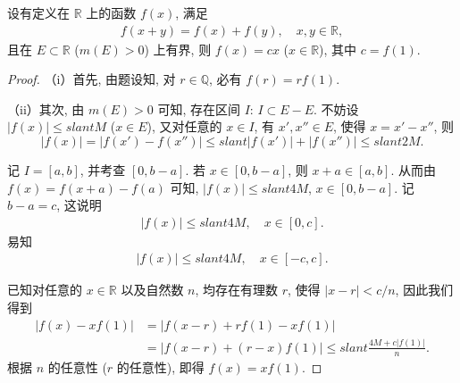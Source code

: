 \documentclass[../../main.tex]{subfiles}
\begin{document}
\begin{proposition}
设有定义在 $\mathbb{R}$ 上的函数 $f(x)$, 满足
\begin{align*}
f(x + y) = f(x) + f(y),\quad x,y\in\mathbb{R},
\end{align*}
且在 $E\subset\mathbb{R}$ ($m(E)>0$) 上有界, 则 $f(x)=cx$ ($x\in\mathbb{R}$), 其中 $c = f(1)$.

\end{proposition}
\begin{proof}
（i）首先, 由题设知, 对 $r\in\mathbb{Q}$, 必有 $f(r)=rf(1)$.

（ii）其次, 由 $m(E)>0$ 可知, 存在区间 $I$: $I\subset E - E$. 不妨设 $|f(x)|\leqslant slant M$ ($x\in E$), 又对任意的 $x\in I$, 有 $x',x''\in E$, 使得 $x = x' - x''$, 则
\[
|f(x)| = |f(x') - f(x'')|\leqslant slant |f(x')| + |f(x'')|\leqslant slant 2M.
\]

记 $I = [a,b]$, 并考查 $[0,b - a]$. 若 $x\in [0,b - a]$, 则 $x + a\in [a,b]$. 从而由 $f(x) = f(x + a) - f(a)$ 可知, $|f(x)|\leqslant slant 4M$, $x\in [0,b - a]$. 记 $b - a = c$, 这说明
\begin{align*}
|f(x)|\leqslant slant 4M,\quad x\in [0,c].
\end{align*}
易知
\begin{align*}
|f(x)|\leqslant slant 4M,\quad x\in [-c,c].
\end{align*}

已知对任意的 $x\in\mathbb{R}$ 以及自然数 $n$, 均存在有理数 $r$, 使得 $|x - r|<c/n$, 因此我们得到
\begin{align*}
|f(x) - xf(1)|&=|f(x - r) + rf(1) - xf(1)|\\
&=|f(x - r) + (r - x)f(1)|\leqslant slant\frac{4M + c|f(1)|}{n}.
\end{align*}
根据 $n$ 的任意性 ($r$ 的任意性), 即得 $f(x)=xf(1)$. 
\end{proof}
\end{document}
